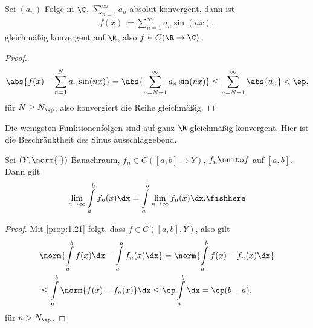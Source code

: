 \begin{bsp}
\label{bsp:1.24}
Sei $(a_n)$ Folge in $\C$, $\sum\limits_{n=1}^\infty a_n$ absolut konvergent,
dann ist
\begin{align*}
f(x) := \sum\limits_{n=1}^\infty a_n\sin(nx),
\end{align*}
gleichmäßig konvergent auf $\R$, also $f\in C(\R\to \C)$.
\begin{proof}
\begin{align*}
\abs{f(x) -  \sum\limits_{n=1}^N a_n\sin(nx)} = \abs{\sum\limits_{n=N+1}^\infty
a_n\sin(nx)} \le \sum\limits_{n=N+1}^\infty \abs{a_n} < \ep,
\end{align*}
für $N\ge N_\ep$, also konvergiert die Reihe gleichmäßig.\qedhere
\end{proof}
Die wenigsten Funktionenfolgen sind auf ganz $\R$ gleichmäßig konvergent. Hier
ist die Beschränktheit des Sinus ausschlaggebend.\bsphere
\end{bsp}

\begin{prop}
\label{prop:1.25}
Sei $(Y,\norm{\cdot})$ Banachraum, $f_n\in C([a,b]\to Y)$, $f_n\unito f$ auf
$[a,b]$. Dann gilt
\begin{align*}
\lim\limits_{n\to\infty} \int\limits_a^b f_n(x) \dx = \int\limits_a^b
\lim\limits_{n\to\infty} f_n(x) \dx.\fishhere
\end{align*}
\end{prop}
\begin{proof}
Mit \ref{prop:1.21} folgt, dass $f\in C([a,b],Y)$, also gilt
\begin{align*}
&\norm{\int\limits_a^b f(x)\dx - \int\limits_a^b f_n(x)\dx} =
\norm{\int\limits_a^b f(x)-f_n(x) \dx} \\ & \le \int\limits_a^b
\norm{f(x)-f_n(x)} \dx \le \ep \int\limits_a^b \dx = \ep(b-a), 
\end{align*}
für $n>N_\ep$.\qedhere
\end{proof}

